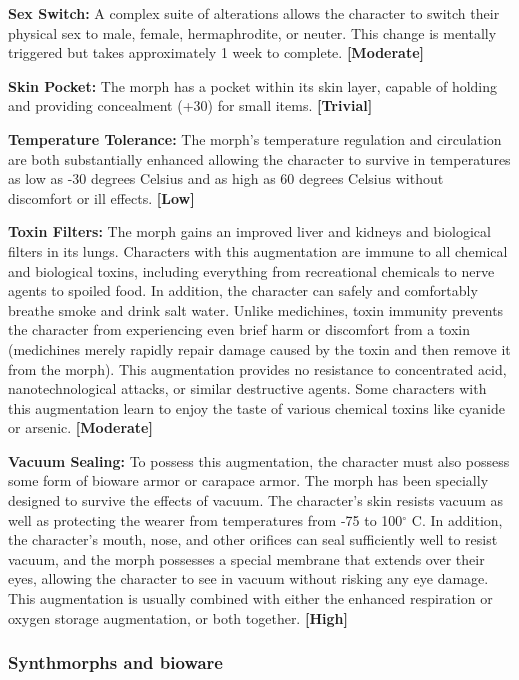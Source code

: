 \textbf{Sex Switch:} A complex suite of alterations allows the character to switch their physical sex to male, female, hermaphrodite, or neuter. This change is mentally triggered but takes approximately 1 week to complete. \textbf{[Moderate]} 

\textbf{Skin Pocket:} The morph has a pocket within its skin layer, capable of holding and providing concealment (+30) for small items. \textbf{[Trivial]} 

\textbf{Temperature Tolerance:} The morph’s temperature regulation and circulation are both substantially enhanced allowing the character to survive in temperatures as low as -30 degrees Celsius and as high as 60 degrees Celsius without discomfort or ill effects. \textbf{[Low]} 

\textbf{Toxin Filters:} The morph gains an improved liver and kidneys and biological filters in its lungs. Characters with this augmentation are immune to all chemical and biological toxins, including everything from recreational chemicals to nerve agents to spoiled food. In addition, the character can safely and comfortably breathe smoke and drink salt water. Unlike medichines, toxin immunity prevents the character from experiencing even brief harm or discomfort from a toxin (medichines merely rapidly repair damage caused by the toxin and then remove it from the morph). This augmentation provides no resistance to concentrated acid, nanotechnological attacks, or similar destructive agents. Some characters with this augmentation learn to enjoy the taste of various chemical toxins like cyanide or arsenic. \textbf{[Moderate]} 

\textbf{Vacuum Sealing:} To possess this augmentation, the character must also possess some form of bioware armor or carapace armor. The morph has been specially designed to survive the effects of vacuum. The character’s skin resists vacuum as well as protecting the wearer from temperatures from -75 to 100$^{\circ}$ C. In addition, the character’s mouth, nose, and other orifices can seal sufficiently well to resist vacuum, and the morph possesses a special membrane that extends over their eyes, allowing the character to see in vacuum without risking any eye damage. This augmentation is usually combined with either the enhanced respiration or oxygen storage augmentation, or both together. \textbf{[High]} 

\subsubsection{Synthmorphs and bioware} 

